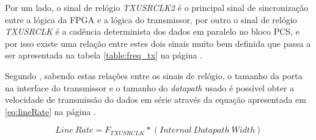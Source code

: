 Por um lado, o sinal de relógio \textit{TXUSRCLK2} é o principal sinal de sincronização entre a lógica da FPGA e a lógica do transmissor, por outro o sinal de relógio \textit{TXUSRCLK} é a cadência determinista dos dados em paralelo no bloco PCS, e por isso existe uma relação entre estes dois sinais muito bem definida que passa a ser apresentada na tabela \ref{table:freq_tx} na página \pageref{table:freq_tx}.

\begin{table}[h!]
	\centering
	\caption[Relação entre as frequências dos sinais de relógio \textit{TXUSRCLK2} e \textit{TXUSRCLK}]{Relação entre as frequências dos sinais de relógio \textit{TXUSRCLK2} e \textit{TXUSRCLK} (adaptada de \cite{R011})}
	\label{table:freq_tx}
\end{table}


Segundo \cite{R011}, sabendo estas relações entre os sinais de relógio, o tamanho da porta na interface do transmissor e o tamanho do \textit{datapath} usado é possível obter a velocidade de transmissão do dados em série através da equação apresentada em \ref{eq:lineRate} na página \pageref{eq:lineRate}.

\begin{equation} \label{eq:lineRate}
Line\ Rate = F_{TXUSRCLK}*(Internal\ Datapath\ Width)
\end{equation}


